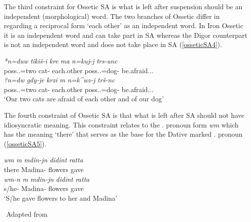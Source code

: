 The third constraint for Ossetic SA is what is left after suspension should be an independent (morphological) word. The two branches of Ossetic differ in regarding a reciprocal form `each other' as an independent word. In Iron Ossetic it is an independent word and can take part in SA whereas the Digor counterpart is not an independent word and does not take place in SA (\ref{osseticSA4}).

\begin{exe}
    \ex \label{osseticSA4}
    \begin{xlist}
        \ex 
        \gll 
        \textit{*n\textturna=duw\textturna} \textit{tiki\v{s}-i} \textit{k\textturna r\textturna\textdyoghlig e} \textit{\textturna ma} \textit{n\textturna=kuj-\textturna j} \textit{t\textturna rs-unc\textturna} \\ poss.{\First}.{\Pl}=two cat-{\Obl} each.other {\And} poss.{\First}.{\Pl}=dog-{\Abl} be.afraid.{\Prs}.{\Third}.{\Pl} \\
    
        \ex 
        \gll 
        \textit{?n\textturna=d\textschwa w\textturna} \textit{g\textturna dy-je} \textit{k\textturna r\textturna zi} \textit{\textturna m\textturna} \textit{n\textturna=k^w\textschwa z-\textturna j} \textit{t\textturna r\v{s}-\textschwa nc} \\ poss.{\First}.{\Pl}=two cat-{\Obl} each.other {\And} poss.{\First}.{\Pl}=dog-{\Abl} be.afraid.{\Prs}.{\Third}.{\Pl} \\
        \glt `Our two cats are afraid of each other and of our dog'
    \end{xlist}
\end{exe}

The fourth constraint of Ossetic SA is that what is left after SA should not have idiosyncratic meaning. This constraint relates to the {\Third}.{\Sg} pronoun form \textit{w\textschwa m} which has the meaning `there' that serves as the base for the Dative marked {\Third}.{\Sg} pronoun (\ref{osseticSA5}).

\begin{exe}
    \ex \label{osseticSA5}
    \begin{xlist}
        \ex 
    \gll 
    \textit{w\textschwa m} \textit{\textturna m\textturna} \textit{m\textturna din\textturna-j\textturna n} \textit{didin\textdyoghlig\textschwa t\textturna} \textit{ratta} \\ there {\And} Madina-{\Dat} flowers gave \\
    
    \ex 
    \gll 
    \textit{w\textschwa m-\textturna n} \textit{\textturna m\textturna} \textit{m\textturna din\textturna-j\textturna n} \textit{didin\textdyoghlig\textschwa t\textturna} \textit{ratta} \\ s/he-{\Dat} {\And} Madina-{\Dat} flowers gave \\
    \glt `S/he gave flowers to her and Madina'
    \end{xlist}
    ${}$ \hfill Adapted from \cite{erschler2012suspended}
\end{exe}

